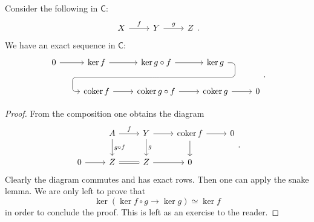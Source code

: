 \documentclass[../Main]{subfiles}
\begin{document}
\begin{lem}\label{lem:kerCokerSequence}
	Consider the following in $\mathsf{C}$:
	\begin{equation}
	\begin{tikzcd}
		X \arrow[r, "f", rightarrow] &
		Y \arrow[r, "g", rightarrow] &
		Z
	\end{tikzcd}
	.\end{equation} 
	We have an exact sequence in $\mathsf{C}$:
	\begin{equation}
	\begin{tikzcd}
		0 \arrow[r, "", rightarrow] &
		\ker f \arrow[r, "", rightarrow] &
		\ker g \circ f \arrow[r, "", rightarrow] 
		\arrow[d, phantom, ""{coordinate, name=Z}] &
		\ker g   
		\arrow[dll, "", rounded corners, bend left = 100,
		to path={ -- ([xshift=2ex]\tikztostart.east)
			|- (Z) [near end]\tikztonodes
			-| ([xshift=-2ex]\tikztotarget.west)
			-- (\tikztotarget)}] & \\
		&
		\coker f \arrow[r, "", rightarrow] &
		\coker g \circ f \arrow[r, "", rightarrow] &
		\coker g \arrow[r, "", rightarrow] &
		0
	\end{tikzcd}
	.\end{equation} 
\end{lem} 
\begin{proof}
	From the composition one obtains the diagram
	\begin{equation}
	\begin{tikzcd}
		&
		A \arrow[r, "f", rightarrow] 
		\arrow[d, "g \circ f", rightarrow] &
		Y \arrow[d, "g", rightarrow] \arrow[r, "", rightarrow] &
		\coker f \arrow[r, "", rightarrow] \arrow[d, "", rightarrow] &
		0\\
		0 \arrow[r, "", rightarrow] &
		Z \arrow[r, "", equal] &
		Z \arrow[r, "", rightarrow] &
		0
	\end{tikzcd}
	.\end{equation} 
	Clearly the diagram commutes and has exact rows.
	Then one can apply the snake lemma.
	We are only left to prove that
	\begin{equation}
		\ker \left( \ker f \circ g \to \ker g \right) \simeq \ker f
	\end{equation} 
	in order to conclude the proof.
	This is left as an exercise to the reader.
\end{proof}
\end{document}
